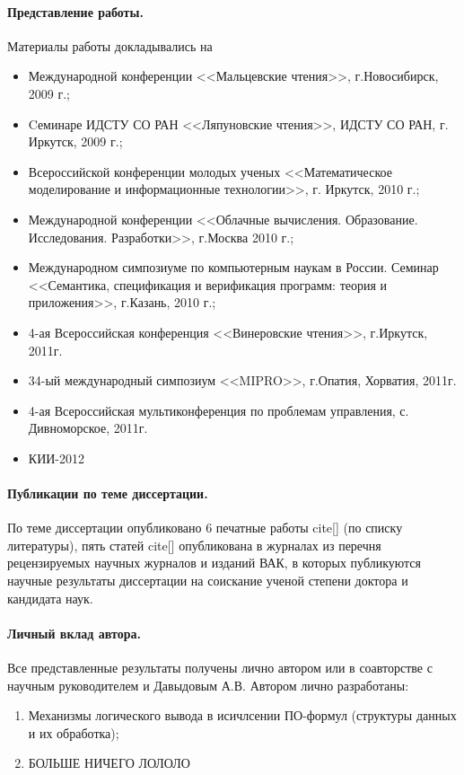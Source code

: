 \paragraph{Представление работы.} Материалы работы докладывались на 
\begin{itemize}
\item Международной конференции <<Мальцевские чтения>>, г.Новосибирск, 2009 г.;
\item Cеминаре ИДСТУ СО РАН <<Ляпуновские чтения>>, ИДСТУ СО РАН, г. Иркутск, 2009 г.;
\item Всероссийской конференции молодых ученых <<Математическое моделирование и информационные технологии>>, г. Иркутск, 2010 г.; 
\item Международной конференции <<Облачные вычисления. Образование. Исследования. Разработки>>, г.Москва 2010 г.;
\item Международном симпозиуме по компьютерным наукам в России. Семинар <<Семантика, спецификация и верификация программ: теория и приложения>>, г.Казань, 2010 г.;
\item 4-ая Всероссийская конференция <<Винеровские чтения>>, г.Иркутск, 2011г.
\item 34-ый международный симпозиум <<MIPRO>>, г.Опатия, Хорватия, 2011г.
\item 4-ая Всероссийская мультиконференция по проблемам управления, с. Дивноморское, 2011г.
\item КИИ-2012
\end{itemize}

\paragraph{Публикации по теме диссертации.} По теме диссертации опубликовано 6 печатные работы cite[] (по списку литературы), пять статей cite[] опубликована в журналах из перечня рецензируемых научных журналов и изданий ВАК, в которых публикуются научные результаты диссертации на соискание ученой степени доктора и кандидата наук.

\paragraph{Личный вклад автора.} Все представленные результаты получены лично автором или в соавторстве с научным руководителем и Давыдовым А.В. Автором лично разработаны:
\begin{enumerate}
\item Механизмы логического вывода в исичлсении ПО-формул (структуры данных и их обработка); 
\item БОЛЬШЕ НИЧЕГО ЛОЛОЛО
\end{enumerate}

